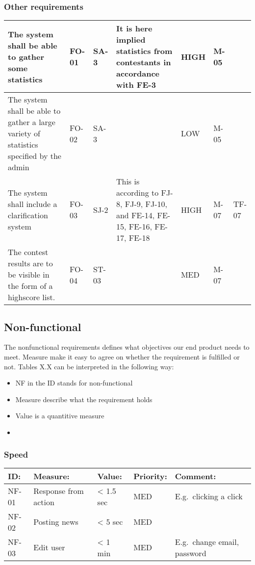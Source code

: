 \subsubsection{Other requirements}
\begin{supertabular}{|m{1.1191599in}|m{0.35875985in}|m{0.33795986in}|m{1.2580599in}|m{0.5045598in}|m{1.1087599in}|m{1.0670599in}|}
\hline
The system shall be able to gather some statistics & FO-01 & SA-3 & It is here
implied statistics from contestants in accordance with FE-3 & HIGH & M-05 &
\\\hline The system shall be able to gather a large variety of statistics
specified by the admin & FO-02 & SA-3 &
 & LOW & M-05 &
\\\hline The system shall include a clarification system & FO-03 & SJ-2 & This
is according to FJ-8, FJ-9, FJ-10, and FE-14, FE-15, FE-16, FE-17, FE-18 & HIGH
& M-07 & TF-07\\\hline The contest results are to be visible in the form of a
highscore list. & FO-04 & ST-03 &
 & MED & M-07 &
\\\hline
\end{supertabular}

\subsection{Non-functional}
The nonfunctional requirements defines what objectives our end product needs to
meet. Measure make it easy to agree on whether the requirement is fulfilled or
not. Tables X.X %
can be interpreted in the following way: 
\begin{itemize}
    \item NF in the ID stands for non-functional
    \item Measure describe what the requirement holds
    \item Value is a quantitive measure 
    \item 
\end{itemize}

\subsubsection{Speed}
\begin{supertabular}{|l|p{5cm}|p{1.8cm}|l|p{4.4cm}|}
\hline
\textbf{ID:} & \textbf{Measure:} & \textbf{Value:} & \textbf{Priority:} & \textbf{Comment:}\\
\hline

NF-01 & Response from action & {\textless} 1.5 sec & MED & E.g.\ clicking a click\\
\hline

NF-02 & Posting news & {\textless} 5 sec & MED & \\
\hline

NF-03 & Edit user & {\textless} 1 min & MED & E.g.\ change email, password \\
\hline
\end{supertabular}

